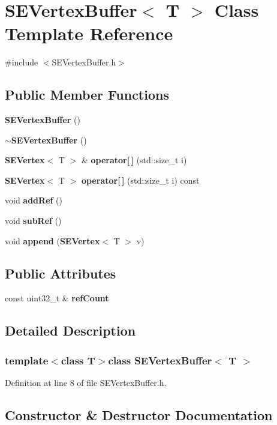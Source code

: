 \section{S\+E\+Vertex\+Buffer$<$ T $>$ Class Template Reference}
\label{class_s_e_vertex_buffer}


{\ttfamily \#include $<$S\+E\+Vertex\+Buffer.\+h$>$}

\subsection*{Public Member Functions}
\begin{DoxyCompactItemize}
\item 
{\bf S\+E\+Vertex\+Buffer} ()
\item 
{\bf $\sim$\+S\+E\+Vertex\+Buffer} ()
\item 
{\bf S\+E\+Vertex}$<$ T $>$ \& {\bf operator[$\,$]} (std\+::size\+\_\+t i)
\item 
{\bf S\+E\+Vertex}$<$ T $>$ {\bf operator[$\,$]} (std\+::size\+\_\+t i) const 
\item 
void {\bf add\+Ref} ()
\item 
void {\bf sub\+Ref} ()
\item 
void {\bf append} ({\bf S\+E\+Vertex}$<$ T $>$ v)
\end{DoxyCompactItemize}
\subsection*{Public Attributes}
\begin{DoxyCompactItemize}
\item 
const uint32\+\_\+t \& {\bf ref\+Count}
\end{DoxyCompactItemize}


\subsection{Detailed Description}
\subsubsection*{template$<$class T$>$class S\+E\+Vertex\+Buffer$<$ T $>$}



Definition at line 8 of file S\+E\+Vertex\+Buffer.\+h.



\subsection{Constructor \& Destructor Documentation}
